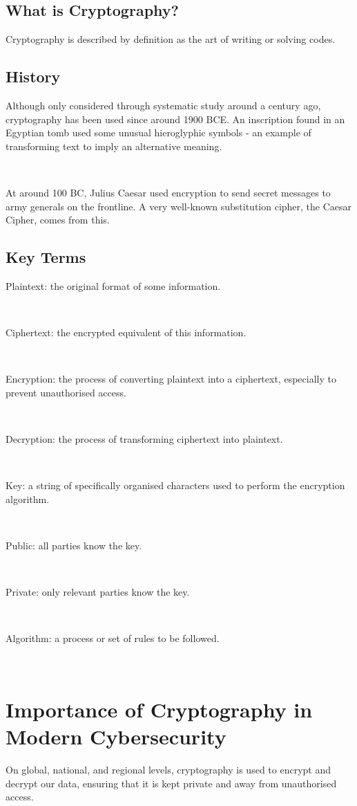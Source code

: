 \documentclass[11pt]{article}
\begin{document}
\subsection{What is Cryptography?}
Cryptography is described by definition as the art of writing or solving codes. 

\subsection{History}
Although only considered through systematic study around a century ago, cryptography has been used since around 1900 BCE. An inscription found in an Egyptian tomb used some unusual hieroglyphic symbols - an example of transforming text to imply an alternative meaning. 

\

At around 100 BC, Julius Caesar used encryption to send secret messages to army generals on the frontline. A very well-known substitution cipher, the Caesar Cipher, comes from this.

\subsection{Key Terms}
Plaintext: the original format of some information.

\

Ciphertext: the encrypted equivalent of this information. 

\

Encryption: the process of converting plaintext into a ciphertext, especially to prevent unauthorised access. 

\

Decryption: the process of transforming ciphertext into plaintext. 

\

Key: a string of specifically organised characters used to perform the encryption algorithm.

\

Public: all parties know the key.

\

Private: only relevant parties know the key.

\

Algorithm: a process or set of rules to be followed.

\


\section{Importance of Cryptography in Modern Cybersecurity}
On global, national, and regional levels, cryptography is used to encrypt and decrypt our data, ensuring that it is kept private and away from unauthorised access. 
\end{document}
